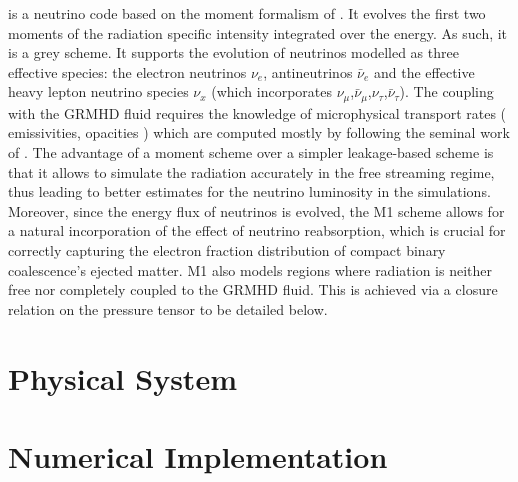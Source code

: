 \FMONE is a neutrino code based on the moment formalism of \cite{FIM1_FIL_M1_ShibataMoments}. It evolves the first two moments of the radiation specific intensity integrated over the energy. As such, it is a grey scheme. It supports the evolution of neutrinos modelled as three effective species: the electron neutrinos $\nu_e$, antineutrinos $\bar{\nu}_e$ and the effective heavy lepton neutrino species $\nu_x$ (which incorporates $\nu_\mu$,$\bar{\nu}_\mu$,$\nu_\tau$,$\bar{\nu}_\tau$).
The coupling with the GRMHD fluid requires the knowledge of microphysical transport rates ( emissivities, opacities ) which are computed mostly by following the seminal work of \cite{FILM1_FIL_M1_Ruffert1996}. The advantage of a moment scheme over a simpler leakage-based scheme is that it allows to simulate  the radiation accurately in the free streaming regime, thus leading to better estimates for the neutrino luminosity in the simulations. Moreover, since the energy flux of neutrinos is evolved, the M1 scheme allows for a natural incorporation of the effect of neutrino reabsorption, which is crucial for correctly capturing the electron fraction distribution of compact binary coalescence's ejected matter.
M1 also models regions where radiation is neither free nor completely coupled to the GRMHD fluid. This is achieved via a closure relation on the pressure tensor to be detailed below.

\section{Physical System}

\section{Numerical Implementation}

